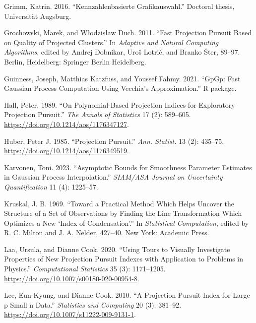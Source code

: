 \documentclass[
  12pt,
]{interact}
\newlength{\cslhangindent}
\newlength{\cslentryspacingunit} %
\newenvironment{CSLReferences}[2] %
 {%
  \setlength{\parindent}{0pt}
  \ifodd #1
  \let\oldpar\par
  \def\par{\hangindent=\cslhangindent\oldpar}
  \fi
  \setlength{\parskip}{#2\cslentryspacingunit}
 }%
 {}
\theoremstyle{plain}
\begin{document}
\begin{CSLReferences}{1}{0}
\leavevmode{}%
Grimm, Katrin. 2016. {``Kennzahlenbasierte Grafikauswahl.''} Doctoral
thesis, Universit{ä}t Augsburg.

\leavevmode{}%
Grochowski, Marek, and Włodzisław Duch. 2011. {``Fast Projection Pursuit
Based on Quality of Projected Clusters.''} In \emph{Adaptive and Natural
Computing Algorithms}, edited by Andrej Dobnikar, Uroš Lotrič, and
Branko Šter, 89--97. Berlin, Heidelberg: Springer Berlin Heidelberg.

\leavevmode{}%
Guinness, Joseph, Matthias Katzfuss, and Youssef Fahmy. 2021. {``{GpGp}:
Fast {G}aussian Process Computation Using {V}ecchia's Approximation.''}
R package.

\leavevmode{}%
Hall, Peter. 1989. {``On Polynomial-Based Projection Indices for
Exploratory Projection Pursuit.''} \emph{The Annals of Statistics} 17
(2): 589--605. \url{https://doi.org/10.1214/aos/1176347127}.

\leavevmode{}%
Huber, Peter J. 1985. {``Projection Pursuit.''} \emph{Ann. Statist.} 13
(2): 435--75. \url{https://doi.org/10.1214/aos/1176349519}.

\leavevmode{}%
Karvonen, Toni. 2023. {``Asymptotic Bounds for Smoothness Parameter
Estimates in {G}aussian Process Interpolation.''} \emph{SIAM/ASA Journal
on Uncertainty Quantification} 11 (4): 1225--57.

\leavevmode{}%
Kruskal, J. B. 1969. {``Toward a Practical Method Which Helps Uncover
the Structure of a Set of Observations by Finding the Line
Transformation Which Optimizes a New {`Index of Condensation'}.''} In
\emph{Statistical Computation}, edited by R. C. Milton and J. A. Nelder,
427--40. New York: Academic Press.

\leavevmode{}%
Laa, Ursula, and Dianne Cook. 2020. {``Using Tours to Visually
Investigate Properties of New Projection Pursuit Indexes with
Application to Problems in Physics.''} \emph{Computational Statistics}
35 (3): 1171--1205. \url{https://doi.org/10.1007/s00180-020-00954-8}.

\leavevmode{}%
Lee, Eun-Kyung, and Dianne Cook. 2010. {``A Projection Pursuit Index for
Large p Small n Data.''} \emph{Statistics and Computing} 20 (3):
381--92. \url{https://doi.org/10.1007/s11222-009-9131-1}.


\end{CSLReferences}
\end{document}
